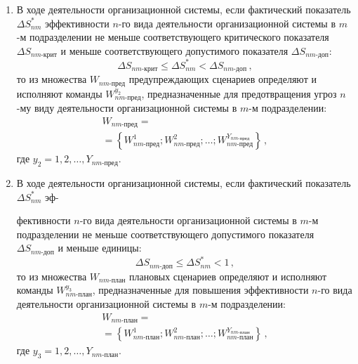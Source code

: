 \begin{multicols}{2}
\begin{enumerate}[1.]
\item В ходе деятельности организационной сис\-те\-мы, если фактический показатель
$\Delta S^*_{nm}$ эффективности $n$-го вида деятельности организационной системы в
$m$-м подразделении не меньше соответствующего критического показателя
$\Delta S_{nm\mbox{-}\mathrm{крит}}$ и меньше соответствующего допустимого показателя
$\Delta S_{nm\mbox{-}\mathrm{доп}}$:
\begin{equation*}
      \Delta S_{nm\mbox{-}\mathrm{крит}}\leq \Delta S^*_{nm}< \Delta
      S_{nm\mbox{-}\mathrm{доп}}\,,
      \end{equation*}
      то из множества $W_{nm\mbox{-}\mathrm{пред}}$
предупреждающих сценариев определяют и исполняют команды
$W^{y_2}_{nm\mbox{-}\mathrm{пред}}$, предназначенные для
предотвращения угроз $n$-му виду деятельности организационной
сис\-те\-мы в $m$-м подразделении:
      \begin{multline*}
     W_{nm\mbox{-}\mathrm{пред}} ={}\\
     {}= \left\{W^1_{nm\mbox{-}\mathrm{пред}};
     W^2_{nm\mbox{-}\mathrm{пред}}; \ldots ;
     W^{Y_{nm\mbox{-}\mathrm{пред}}}_{nm\mbox{-}\mathrm{пред}} \right\}\,, 	
     \end{multline*}
где $y_2 = 1, 2, \ldots , Y_{nm\mbox{-}\mathrm{пред}}$.\\[-15pt]

\item В ходе деятельности организационной сис\-те\-мы, если фактический показатель
$\Delta S^*_{nm}$ эф-\linebreak\vspace*{-12pt}

\pagebreak

\noindent
фективности $n$-го вида деятельности организационной системы в
$m$-м подразделении не меньше соответствующего допустимого показателя $\Delta
S_{nm\mbox{-}\mathrm{доп}}$ и меньше единицы:
\begin{equation*}
      \Delta S_{nm\mbox{-}\mathrm{доп}}\leq  \Delta S^*_{nm}< 1\,, 	
      \end{equation*}
      то из множества $W_{nm\mbox{-}\mathrm{план}}$ плановых
сценариев определяют и исполняют команды
      $W^{y_3}_{nm\mbox{-}\mathrm{план}}$, предназначенные для
повышения эффек\-тив\-ности \mbox{$n$-го} вида деятельности
организационной системы в \mbox{$m$-м} подразделении:
      \begin{multline*}
     W_{nm\mbox{-}\mathrm{план}} = {}\\
     {}=\left\{ W^1_{nm\mbox{-}\mathrm{план}};
     W^2_{nm\mbox{-}\mathrm{план}}; \ldots ;
     W^{Y_{nm\mbox{-}\mathrm{план}}}_{nm\mbox{-}\mathrm{план}}\right\}\,,
     \end{multline*}
     где $y_3 = 1, 2, \ldots , Y_{nm\mbox{-}\mathrm{план}}$.
     \end{enumerate}



\end{multicols}
